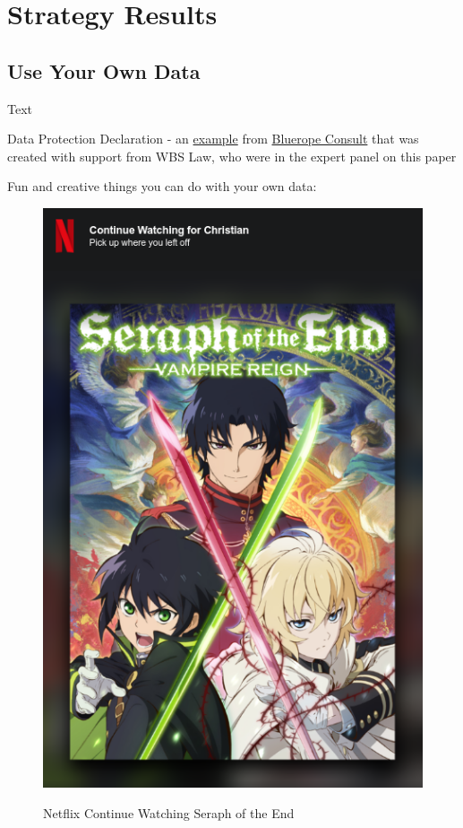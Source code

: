 %
%

\pagebreak
\section{Strategy Results}

\onehalfspacing

\subsection{Use Your Own Data}

Text

Data Protection Declaration - an \href{https://blueropeconsultonline.de/datenschutz/}{example} from \href{https://blueropeconsultonline.de/}{Bluerope Consult} that was created with support from WBS Law, who were in the expert panel on this paper

Fun and creative things you can do with your own data:

\begin{figure}[H]
\centering
\caption {Netflix Continue Watching Seraph of the End}
\includegraphics[scale=0.6]{images/continue-seraph.png}
\label{fig:seraph}
\end{figure}

